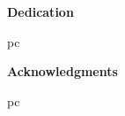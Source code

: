 \documentclass[11 pt]{report}
\begin{document}
%   

\lineskiplimit=1pc
\renewcommand{\thepage}{\roman{page}}
\setcounter{page}{3}

\vspace*{.30 in}%

\begin{center}
    {\Large \bf Dedication}
\end{center}
 pc

\noindent 

%


\pagebreak
\vspace*{0.30 in}%
\begin{center}
    {\Large \bf Acknowledgments}
\end{center}
 pc

\noindent 

%
\end{document}
